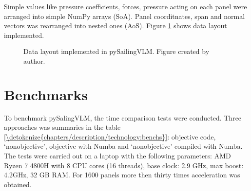 \documentclass[a4paper,12pt,english]{jupyterBook}
\let\sphinxpxdimen\pdfpxdimen\else\newdimen\sphinxpxdimen
\begin{document}
\sphinxAtStartPar
Simple values like pressure coefficients, forces, pressure acting on each panel were arranged into simple NumPy arrays (SoA). Panel coorditnates, span and normal vectors was rearranged into nested ones (AoS). Figure \hyperref[\detokenize{chapters/description/technology:uklad}]{\ref{\detokenize{chapters/description/technology:uklad}}} shows data layout implemented.

\begin{figure}[htbp]
\centering
\capstart

\noindent\sphinxincludegraphics[height=600\sphinxpxdimen]{{panele.drawio}.png}
\caption{Data layout implemented in pySailingVLM. Figure created by author.}\label{\detokenize{chapters/description/technology:uklad}}\end{figure}


\part{Benchmarks}
\label{\detokenize{chapters/description/technology:benchmarks}}
\sphinxAtStartPar
To benchmark pySalingVLM, the time comparison tests were conducted. Three approaches was summaries in the table \hyperref[\detokenize{chapters/description/technology:benchs}]{\ref{\detokenize{chapters/description/technology:benchs}}}: objective code, ‘non\sphinxhyphen{}objective’,  objective with Numba and ‘non\sphinxhyphen{}objective’ compiled with Numba.  The tests were carried out on a laptop with the following parameters: AMD Ryzen 7 4800H with 8 CPU cores (16 threads), base clock: 2.9 GHz, max boost: 4.2GHz, 32 GB RAM. For 1600 panels more then thirty times acceleration was obtained.
\end{document}
